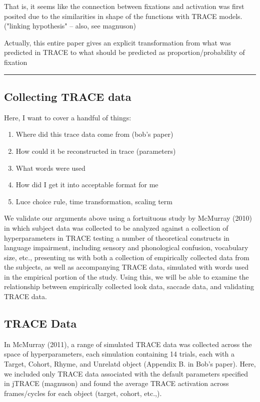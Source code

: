 \documentclass{article}
\begin{document}
That is, it seems like the connection between fixations and activation was first posited due to the similarities in shape of the functions with TRACE models. ("linking hypothesis" -- also, see magnuson)

Actually, this entire paper gives an explicit transformation from what was predicted in TRACE to what should be predicted as proportion/probability of fixation

\noindent\rule{2cm}{0.4pt}

\subsection{Collecting TRACE data}

Here, I want to cover a handful of things:

\begin{enumerate}
\item Where did this trace data come from (bob's paper)
\item How could it be reconstructed in trace (parameters)
\item What words were used
\item How did I get it into acceptable format for me
\item Luce choice rule, time transformation, scaling term
\end{enumerate}

We validate our arguments above using a fortuituous study by McMurray (2010) in which subject data was collected to be analyzed against a collection of hyperparameters in TRACE testing a number of theoretical constructs in language impairment, including sensory and phonological confusion, vocabulary size, etc., presenting us with both a collection of empirically collected data from the subjects, as well as accompanying TRACE data, simulated with words used in the empirical portion of the study. Using this, we will be able to examine the relationship between empirically collected look data, saccade data, and validating TRACE data.

\subsection{TRACE Data}

In McMurray (2011), a range of simulated TRACE data was collected across the space of hyperparameters, each simulation containing 14 trials, each with a Target, Cohort, Rhyme, and Unrelatd object (Appendix B. in Bob's paper). Here, we included only TRACE data associated with the default parameters specified in jTRACE (magnuson) and found the average TRACE activation across frames/cycles for each object (target, cohort, etc.,).
\end{document}
